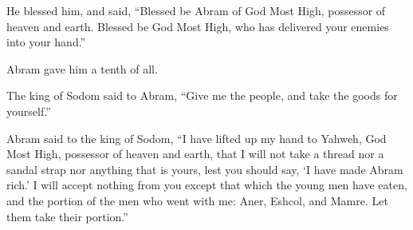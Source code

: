 {He blessed him, and said, “Blessed be Abram of God Most High, possessor of heaven and earth.
Blessed be God Most High, who has delivered your enemies into your hand.”
\par }{\PP Abram gave him a tenth of all.
\par }{\PP {}The king of Sodom said to Abram, “Give me the people, and take the goods for yourself.”
\par }{\PP {}Abram said to the king of Sodom, “I have lifted up my hand to Yahweh, God Most High, possessor of heaven and earth,
that I will not take a thread nor a sandal strap nor anything that is yours, lest you should say, ‘I have made Abram rich.’
I will accept nothing from you except that which the young men have eaten, and the portion of the men who went with me: Aner, Eshcol, and Mamre. Let them take their portion.”

}
